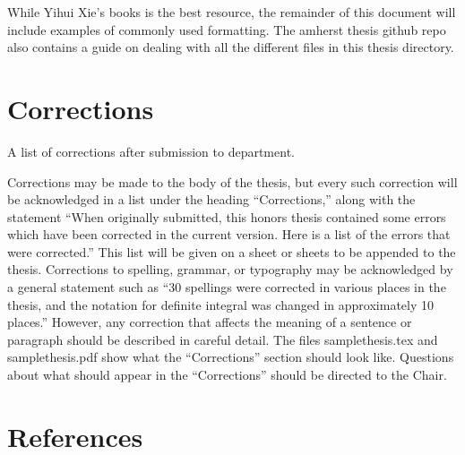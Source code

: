 \documentclass[12pt, twoside]{amherstthesis}
\begin{document}
While Yihui Xie's books is the best resource, the remainder of this document will include examples of commonly used formatting. The amherst thesis github repo also contains a guide on dealing with all the different files in this thesis directory.

\hypertarget{corrections}{%
\chapter*{Corrections}\label{corrections}}

A list of corrections after submission to department.

Corrections may be made to the body of the thesis, but every such correction will be acknowledged in a list under the heading ``Corrections,'' along with the statement ``When originally submitted, this honors thesis contained some errors which have been corrected in the current version. Here is a list of the errors that were corrected.'' This list will be given on a sheet or sheets to be appended to the thesis. Corrections to spelling, grammar, or typography may be acknowledged by a general statement such as ``30 spellings were corrected in various places in the thesis, and the notation for definite integral was changed in approximately 10 places.'' However, any correction that affects the meaning of a sentence or paragraph should be described in careful detail. The files samplethesis.tex and samplethesis.pdf show what the ``Corrections'' section should look like. Questions about what should appear in the ``Corrections'' should be directed to the Chair.

\backmatter

\hypertarget{references}{%
\chapter*{References}\label{references}}

\noindent

\setlength{\parindent}{-0.20in}
\setlength{\leftskip}{0.20in}
\setlength{\parskip}{8pt}

\end{document}
